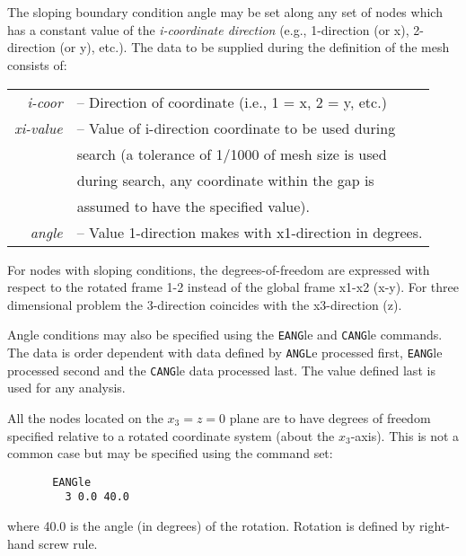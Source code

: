  \\{\smallskip}
 \\{\smallskip}
\headb

The sloping boundary condition angle may be set along
any set of nodes which has a constant value of the {\it i-coordinate
direction} (e.g., 1-direction (or x), 2-direction
(or  y),  etc.).  The data to be supplied during the definition of
the mesh consists of:

\begin{center}
\begin{tabular}{r l}
\it i-coor   &-- Direction of coordinate (i.e., 1 = x, 2 = y, etc.) \\
\it xi-value &-- Value of i-direction coordinate to be used during  \\
             &\quad search (a tolerance of 1/1000 of mesh size is used  \\
             &\quad during search, any coordinate within the gap is  \\
             &\quad assumed to have the specified value).  \\
\it angle    &-- Value 1-direction makes with x1-direction in degrees. \\
\end{tabular}
\end{center}
For nodes with sloping conditions, the degrees-of-freedom
are expressed with respect to the rotated frame 1-2 instead
of the global frame x1-x2 (x-y).  For three dimensional problem
the 3-direction coincides with the x3-direction (z).

Angle conditions may also be specified using the {\tt EANG}le and {\tt CANG}le
commands.  The data is order dependent with data
defined by {\tt ANGL}e processed first, {\tt EANG}le processed second and
the {\tt CANG}le data processed last.  The value defined last is used for
any analysis.


All the nodes located on the $x_3 = z = 0$ plane are to have degrees of freedom
specified relative to a rotated coordinate system (about the $x_3$-axis).  This
is not a common case but may be specified using the command set:
\begin{verbatim}
       EANGle
         3 0.0 40.0
\end{verbatim}
where 40.0 is the angle (in degrees) of the rotation.  Rotation is defined by
right-hand screw rule.
\vfil\eject
